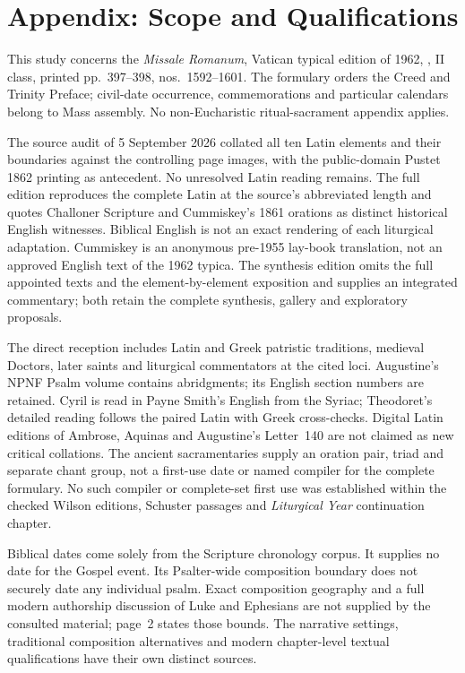 \sectionguard\section*{Appendix: Scope and Qualifications}
This study concerns the \textit{Missale Romanum}, Vatican typical edition of 1962, , II class, printed pp.~397--398, nos.~1592--1601. The formulary orders the Creed and Trinity Preface; civil-date occurrence, commemorations and particular calendars belong to Mass assembly. No non-Eucharistic ritual-sacrament appendix applies.

The source audit of 5 September 2026 collated all ten Latin elements and their boundaries against the controlling page images, with the public-domain Pustet 1862 printing as antecedent. No unresolved Latin reading remains. The full edition reproduces the complete Latin at the source's abbreviated length and quotes Challoner Scripture and Cummiskey's 1861 orations as distinct historical English witnesses. Biblical English is not an exact rendering of each liturgical adaptation. Cummiskey is an anonymous pre-1955 lay-book translation, not an approved English text of the 1962 typica. The synthesis edition omits the full appointed texts and the element-by-element exposition and supplies an integrated commentary; both retain the complete synthesis, gallery and exploratory proposals.

The direct reception includes Latin and Greek patristic traditions, medieval Doctors, later saints and liturgical commentators at the cited loci. Augustine's NPNF Psalm volume contains abridgments; its English section numbers are retained. Cyril is read in Payne Smith's English from the Syriac; Theodoret's detailed reading follows the paired Latin with Greek cross-checks. Digital Latin editions of Ambrose, Aquinas and Augustine's Letter~140 are not claimed as new critical collations. The ancient sacramentaries supply an oration pair, triad and separate chant group, not a first-use date or named compiler for the complete formulary. No such compiler or complete-set first use was established within the checked Wilson editions, Schuster passages and \textit{Liturgical Year} continuation chapter.

Biblical dates come solely from the Scripture chronology corpus. It supplies no date for the Gospel event. Its Psalter-wide composition boundary does not securely date any individual psalm. Exact composition geography and a full modern authorship discussion of Luke and Ephesians are not supplied by the consulted material; page~2 states those bounds. The narrative settings, traditional composition alternatives and modern chapter-level textual qualifications have their own distinct sources.

